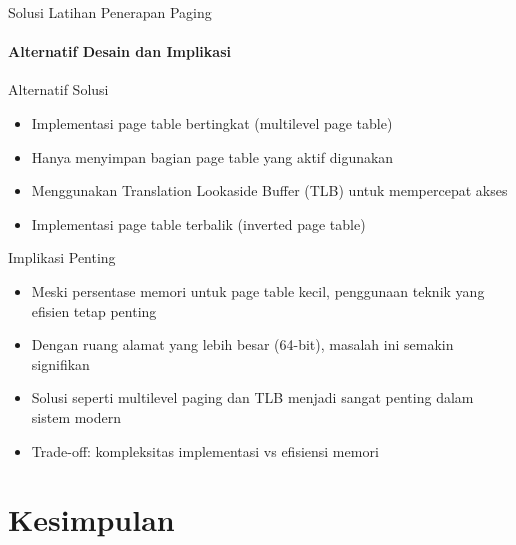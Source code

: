 \documentclass[10pt,aspectratio=169]{beamer}
\begin{document}
\begin{frame}{Solusi Latihan Penerapan Paging}
    \framesubtitle{Alternatif Desain dan Implikasi}
    
    \begin{block}{Alternatif Solusi}
        \begin{itemize}
            \item Implementasi page table bertingkat (multilevel page table)
            \item Hanya menyimpan bagian page table yang aktif digunakan
            \item Menggunakan Translation Lookaside Buffer (TLB) untuk mempercepat akses
            \item Implementasi page table terbalik (inverted page table)
        \end{itemize}
    \end{block}
    
    \begin{alertblock}{Implikasi Penting}
        \begin{itemize}
            \item Meski persentase memori untuk page table kecil, penggunaan teknik yang efisien tetap penting
            \item Dengan ruang alamat yang lebih besar (64-bit), masalah ini semakin signifikan
            \item Solusi seperti multilevel paging dan TLB menjadi sangat penting dalam sistem modern
            \item Trade-off: kompleksitas implementasi vs efisiensi memori
        \end{itemize}
    \end{alertblock}
\end{frame}

\section{Kesimpulan}
\end{document}
